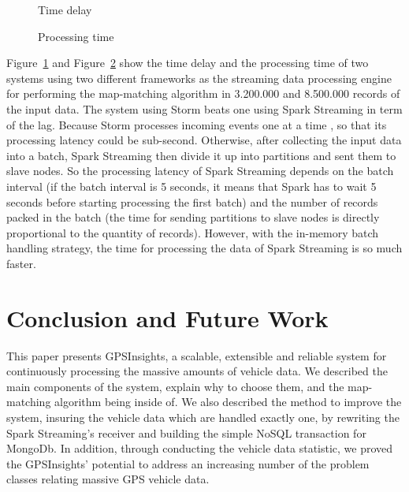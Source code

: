\documentclass{acm_proc_article-sp}
\begin{document}
	\begin{figure}[h]
		\centering
		\caption{Time delay}
		\label{fig:timedelay}
	\end{figure}
	
	\begin{figure}[h]
		\centering
		\caption{Processing time}
		\label{fig:processingtime}
	\end{figure}
	
Figure~\ref{fig:timedelay} and Figure~\ref{fig:processingtime} show the time delay and the processing time of two systems using two different frameworks as the streaming data processing engine for performing the map-matching algorithm in 3.200.000 and 8.500.000 records of the input data. The system using Storm beats one using Spark Streaming in term of the lag. Because Storm processes incoming events one at a time , so that its processing latency could be sub-second. Otherwise, after collecting the input data into a batch, Spark Streaming then divide it up into partitions and sent them to slave nodes. So the processing latency of Spark Streaming depends on the batch interval (if the batch interval is 5 seconds, it means that Spark has to wait 5 seconds before starting processing the first batch)  and the number of records packed in the batch (the time for sending partitions to slave nodes is directly proportional to the quantity of records). However, with the in-memory batch handling strategy, the time for processing the data of Spark Streaming is so much faster.	
	

			
\section{Conclusion and Future Work}
This paper presents GPSInsights, a scalable, extensible and reliable system for continuously processing the massive amounts of vehicle data. We described the main components of the system, explain why to choose them, and the map-matching algorithm being inside of. We also described the method to improve the system, insuring the vehicle data which are handled exactly one, by rewriting the Spark Streaming's receiver and building the simple NoSQL transaction for MongoDb. In addition, through conducting the vehicle data statistic, we proved the GPSInsights' potential to address an increasing number of the problem classes relating massive GPS vehicle data.
\end{document}
